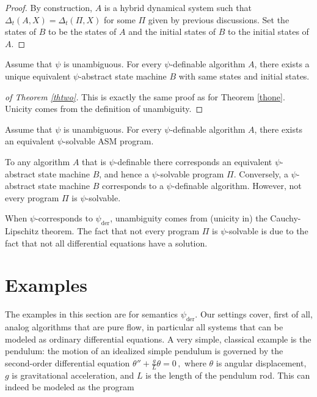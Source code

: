 \documentclass[envcountsame]{llncs}
\newcommand{\gen}[1]{\Delta_t(#1)}
\begin{document}
\begin{proof}By construction, $A$ is a hybrid dynamical
  system such that $\gen{A,X}=\gen{\Pi,X}$ for some $\Pi$ given by
  previous discussions. Set the states of $B$ to be the
  states of $A$ and the initial states of
  $B$ to the initial states of $A$.
\end{proof}





\begin{theorem} \label{thtwo}
  Assume that $\psi$ is unambiguous.
For every $\psi$-definable algorithm $A$, there exists a unique equivalent $\psi$-abstract
  state machine $B$ with same states and initial states.
\end{theorem}



\begin{proof}[of Theorem \ref{thtwo}]
This is exactly the same proof as for Theorem \ref{thone}. Unicity comes from the definition of
unambiguity.
\end{proof}




\begin{corollary} \label{coromain}
Assume that $\psi$ is unambiguous.
For every $\psi$-definable algorithm $A$, there exists an equivalent $\psi$-solvable ASM
  program.
\end{corollary}


To any algorithm $A$ that is $\psi$-definable there corresponds an
    equivalent $\psi$-abstract state machine $B$, and hence a
    $\psi$-solvable program $\Pi$. Conversely, a $\psi$-abstract state
    machine $B$ corresponds to a $\psi$-definable algorithm.
However, not every program $\Pi$ is $\psi$-solvable.

When $\psi$-corresponds to $\psi_{\textrm{der}}$, unambiguity comes from
(unicity in)
the Cauchy-Lipschitz theorem.  The fact that
    not every program $\Pi$ is $\psi$-solvable is due to the fact that
    not all differential equations have a solution.







\section{Examples}


The examples in this section are for semantics $\psi_{\textrm{der}}$.
Our settings cover, first of all, analog algorithms that are  pure flow, in particular all systems that can be modeled as ordinary differential equations.
A very simple, classical example is the pendulum: the motion of an idealized simple pendulum is governed by the second-order
differential equation $
\theta''+\frac{g}{L}\theta = 0\,,
$
where
$\theta$ is angular displacement, $g$ is gravitational acceleration,
and $L$ is the length of the pendulum rod.
This can indeed be modeled as the program
\end{document}
